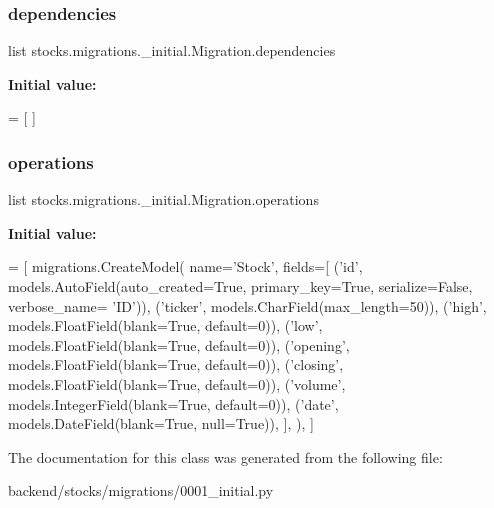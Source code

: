\subsubsection{\texorpdfstring{dependencies}{dependencies}}
{\footnotesize\ttfamily list stocks.\+migrations.\+\_\+initial.\+Migration.\+dependencies\hspace{0.3cm}{\ttfamily [static]}}

{\bfseries Initial value\+:}
\begin{DoxyCode}
=  [
    ]
\end{DoxyCode}
\mbox{\label{classstocks_1_1migrations_1_10001__initial_1_1_migration_ad7876765d8e1c6ddc79df3f27a4e6901}} 
\subsubsection{\texorpdfstring{operations}{operations}}
{\footnotesize\ttfamily list stocks.\+migrations.\+\_\+initial.\+Migration.\+operations\hspace{0.3cm}{\ttfamily [static]}}

{\bfseries Initial value\+:}
\begin{DoxyCode}
=  [
        migrations.CreateModel(
            name=\textcolor{stringliteral}{'Stock'},
            fields=[
                (\textcolor{stringliteral}{'id'}, models.AutoField(auto\_created=\textcolor{keyword}{True}, primary\_key=\textcolor{keyword}{True}, serialize=\textcolor{keyword}{False}, verbose\_name=\textcolor{stringliteral}{
      'ID'})),
                (\textcolor{stringliteral}{'ticker'}, models.CharField(max\_length=50)),
                (\textcolor{stringliteral}{'high'}, models.FloatField(blank=\textcolor{keyword}{True}, default=0)),
                (\textcolor{stringliteral}{'low'}, models.FloatField(blank=\textcolor{keyword}{True}, default=0)),
                (\textcolor{stringliteral}{'opening'}, models.FloatField(blank=\textcolor{keyword}{True}, default=0)),
                (\textcolor{stringliteral}{'closing'}, models.FloatField(blank=\textcolor{keyword}{True}, default=0)),
                (\textcolor{stringliteral}{'volume'}, models.IntegerField(blank=\textcolor{keyword}{True}, default=0)),
                (\textcolor{stringliteral}{'date'}, models.DateField(blank=\textcolor{keyword}{True}, null=\textcolor{keyword}{True})),
            ],
        ),
    ]
\end{DoxyCode}


The documentation for this class was generated from the following file\+:\begin{DoxyCompactItemize}
\item 
backend/stocks/migrations/0001\+\_\+initial.\+py\end{DoxyCompactItemize}
